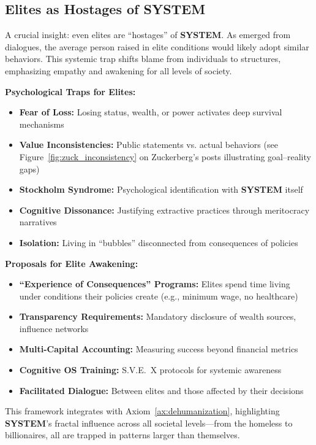 \documentclass[11pt,a4paper]{article}
\newcommand{\SYSTEM}{\textbf{SYSTEM}}
\theoremstyle{definition}
\theoremstyle{remark}
\begin{document}
\subsection{Elites as Hostages of \SYSTEM{}}

A crucial insight: even elites are ``hostages'' of \SYSTEM{}. As emerged from dialogues, the average person raised in elite conditions would likely adopt similar behaviors. This systemic trap shifts blame from individuals to structures, emphasizing empathy and awakening for all levels of society.

\textbf{Psychological Traps for Elites:}
\begin{itemize}
    \item \textbf{Fear of Loss:} Losing status, wealth, or power activates deep survival mechanisms
    \item \textbf{Value Inconsistencies:} Public statements vs. actual behaviors (see Figure~\ref{fig:zuck_inconsistency} on Zuckerberg's posts illustrating goal--reality gaps)
    \item \textbf{Stockholm Syndrome:} Psychological identification with \SYSTEM{} itself
    \item \textbf{Cognitive Dissonance:} Justifying extractive practices through meritocracy narratives
    \item \textbf{Isolation:} Living in ``bubbles'' disconnected from consequences of policies
\end{itemize}

\textbf{Proposals for Elite Awakening:}
\begin{itemize}
    \item \textbf{``Experience of Consequences'' Programs:} Elites spend time living under conditions their policies create (e.g., minimum wage, no healthcare)
    \item \textbf{Transparency Requirements:} Mandatory disclosure of wealth sources, influence networks
    \item \textbf{Multi-Capital Accounting:} Measuring success beyond financial metrics
    \item \textbf{Cognitive OS Training:} S.V.E.~X protocols for systemic awareness
    \item \textbf{Facilitated Dialogue:} Between elites and those affected by their decisions
\end{itemize}

This framework integrates with Axiom~\ref{ax:dehumanization}, highlighting \SYSTEM{}'s fractal influence across all societal levels---from the homeless to billionaires, all are trapped in patterns larger than themselves.
\end{document}
